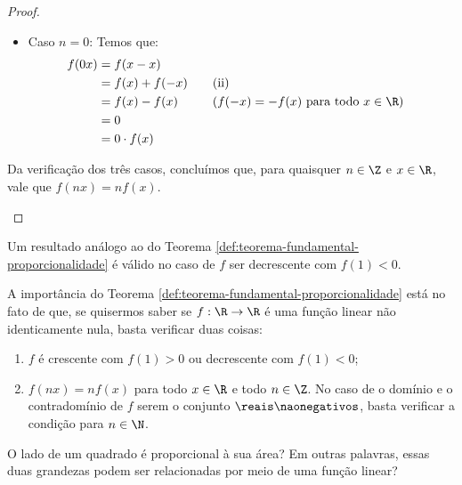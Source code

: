\begin{proof}
\begin{itemize}
\begin{itemize}
      \item Caso $n=0$: Temos que:
      \begin{alignat*}{3}
        f(0x) &= f(x-x) \\
        &= f(x)+f(-x) && \quad\text{(ii)}\\
        &= f(x)-f(x) && \quad\text{($f(-x) = -f(x)$ para todo $x \in \R$)}\\
        &= 0\\
        &= 0 \cdot f(x)
      \end{alignat*}
    \end{itemize}

    Da verificação dos três casos, concluímos que, para quaisquer $n\in\Z$ e $x\in\R$, vale que $f(nx)=nf(x)$.
  \end{itemize}
\end{proof}

\begin{remark}
    Um resultado análogo ao do Teorema \ref{def:teorema-fundamental-proporcionalidade} é válido
    no caso de $f$ ser decrescente com $f(1) < 0$.
\end{remark}

A importância do Teorema \ref{def:teorema-fundamental-proporcionalidade} 
está no fato de que, se quisermos saber se $f: \R \to \R$ é uma função linear não identicamente nula,
basta verificar duas coisas:
%
\begin{enumerate}[1.]
  \item $f$ é crescente com $f(1)>0$ ou decrescente com $f(1)<0$;
  \item $f(nx) = n f(x)$ para todo $x \in \R$ e todo $n \in \Z$. No
  caso de o domínio e o contradomínio de $f$ serem o conjunto $\reais\naonegativos$, basta verificar a condição
  para $n \in \N$.
\end{enumerate}

\begin{example}
O lado de um quadrado é proporcional à sua área? Em outras palavras,
essas duas grandezas podem ser relacionadas por meio de uma função
linear?
\end{example}

